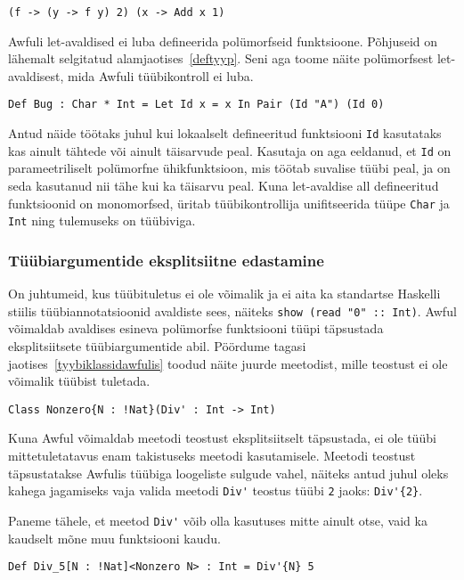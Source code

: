 \documentclass[12pt]{article}
\begin{document}
        \begin{verbatim}(f -> (y -> f y) 2) (x -> Add x 1)\end{verbatim}

        Awfuli let-avaldised ei luba defineerida polümorfseid funktsioone. Põhjuseid on lähemalt selgitatud alamjaotises~\ref{deftyyp}. Seni aga toome näite polümorfsest let-avaldisest, mida Awfuli tüübikontroll ei luba.

        \begin{verbatim}Def Bug : Char * Int = Let Id x = x In Pair (Id "A") (Id 0)\end{verbatim}

        Antud näide töötaks juhul kui lokaalselt defineeritud funktsiooni \verb!Id! kasutataks kas ainult tähtede või ainult täisarvude peal. Kasutaja on aga eeldanud, et \verb!Id! on parameetriliselt polümorfne ühikfunktsioon, mis töötab suvalise tüübi peal, ja on seda kasutanud nii tähe kui ka täisarvu peal. Kuna let-avaldise all defineeritud funktsioonid on monomorfsed, üritab tüübikontrollija unifitseerida tüüpe \verb!Char! ja \verb!Int! ning tulemuseks on tüübiviga.
      \subsubsection{Tüübiargumentide eksplitsiitne edastamine}\label{typeargs}
        On juhtumeid, kus tüübituletus ei ole võimalik ja ei aita ka standartse Haskelli stiilis tüübiannotatsioonid avaldiste sees, näiteks \verb!show (read "0" :: Int)!. Awful võimaldab avaldises esineva polümorfse funktsiooni tüüpi täpsustada eksplitsiitsete tüübiargumentide abil. Pöördume tagasi jaotises~\ref{tyybiklassidawfulis} toodud näite juurde meetodist, mille teostust ei ole võimalik tüübist tuletada.

        \begin{verbatim}Class Nonzero{N : !Nat}(Div' : Int -> Int)\end{verbatim}

        Kuna Awful võimaldab meetodi teostust eksplitsiitselt täpsustada, ei ole tüübi mittetuletatavus enam takistuseks meetodi kasutamisele. Meetodi teostust täpsustatakse Awfulis tüübiga loogeliste sulgude vahel, näiteks antud juhul oleks kahega jagamiseks vaja valida meetodi \verb!Div'! teostus tüübi \verb!2! jaoks: \verb!Div'{2}!.

        Paneme tähele, et meetod \verb!Div'! võib olla kasutuses mitte ainult otse, vaid ka kaudselt mõne muu funktsiooni kaudu.

        \begin{verbatim}Def Div_5[N : !Nat]<Nonzero N> : Int = Div'{N} 5\end{verbatim}
\end{document}
